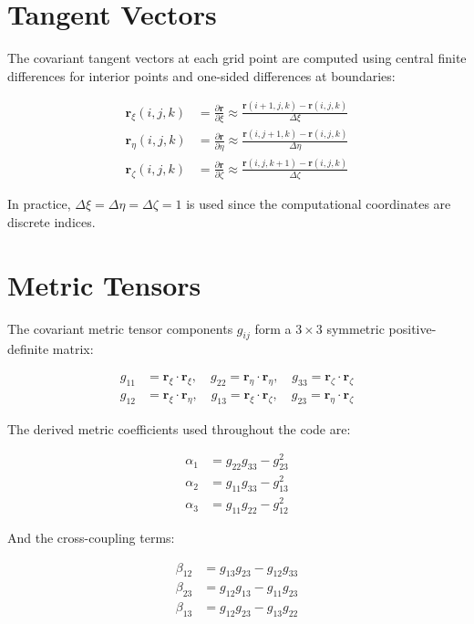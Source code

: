 \documentclass[11pt,a4paper]{report}
\newcommand{\pd}[2]{\frac{\partial #1}{\partial #2}}
\newcommand{\rvec}{\bm{r}}
\begin{document}
\section{Tangent Vectors}

The covariant tangent vectors at each grid point are computed using central finite differences for interior points and one-sided differences at boundaries:

\begin{align}
    \rvec_\xi(i,j,k) &= \pd{\rvec}{\xi} \approx \frac{\rvec(i+1,j,k) - \rvec(i,j,k)}{\Delta\xi} \\
    \rvec_\eta(i,j,k) &= \pd{\rvec}{\eta} \approx \frac{\rvec(i,j+1,k) - \rvec(i,j,k)}{\Delta\eta} \\
    \rvec_\zeta(i,j,k) &= \pd{\rvec}{\zeta} \approx \frac{\rvec(i,j,k+1) - \rvec(i,j,k)}{\Delta\zeta}
\end{align}

In practice, $\Delta\xi = \Delta\eta = \Delta\zeta = 1$ is used since the computational coordinates are discrete indices.

\section{Metric Tensors}

The covariant metric tensor components $g_{ij}$ form a $3 \times 3$ symmetric positive-definite matrix:

\begin{align}
    g_{11} &= \rvec_\xi \cdot \rvec_\xi, \quad
    g_{22} = \rvec_\eta \cdot \rvec_\eta, \quad
    g_{33} = \rvec_\zeta \cdot \rvec_\zeta \\
    g_{12} &= \rvec_\xi \cdot \rvec_\eta, \quad
    g_{13} = \rvec_\xi \cdot \rvec_\zeta, \quad
    g_{23} = \rvec_\eta \cdot \rvec_\zeta
\end{align}

The derived metric coefficients used throughout the code are:

\begin{align}
    \alpha_1 &= g_{22} g_{33} - g_{23}^2 \\
    \alpha_2 &= g_{11} g_{33} - g_{13}^2 \\
    \alpha_3 &= g_{11} g_{22} - g_{12}^2
\end{align}

And the cross-coupling terms:

\begin{align}
    \beta_{12} &= g_{13} g_{23} - g_{12} g_{33} \\
    \beta_{23} &= g_{12} g_{13} - g_{11} g_{23} \\
    \beta_{13} &= g_{12} g_{23} - g_{13} g_{22}
\end{align}
\end{document}
